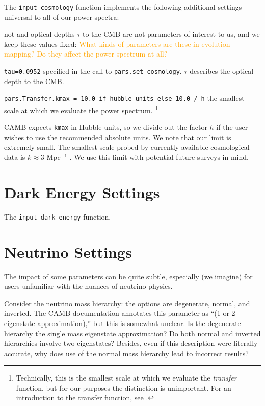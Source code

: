
The \verb|input_cosmology| function implements the following additional
settings universal to all of our power spectra:

 not and optical depths $\tau$ to the CMB 
are not parameters of interest to us, and we keep these values fixed:
\textcolor{orange}{What kinds of parameters are these in evolution mapping?
Do they affect the power spectrum at all?}

\verb|tau=0.0952| \quad specified in the call to \verb|pars.set_cosmology|.
$\tau$ describes the optical depth to the CMB.


\verb|pars.Transfer.kmax = 10.0 if hubble_units else 10.0 / h| \quad the smallest scale at which we evaluate the power spectrum.
\footnote{Technically, this is the smallest scale at which we evaluate the
\textit{transfer} function, but for our purposes the distinction is
unimportant. For an introduction to the transfer function, see \citet{FECS}.} 

CAMB expects \verb|kmax| in Hubble units, so we divide out the factor $h$ if 
the user wishes to use the recommended absolute units.
We note that our limit is extremely small. The smallest scale probed by
currently available cosmological data is $k \approx 3$ Mpc$^{-1}$
. We use this limit with potential future surveys in mind.


\section{Dark Energy Settings}

The \verb|input_dark_energy| function.

\section{Neutrino Settings}


The impact of some parameters can be quite subtle, especially (we imagine)
for users unfamiliar with the nuances of neutrino physics.

Consider the neutrino mass 
hierarchy: the options are degenerate, normal, and inverted. The CAMB 
documentation annotates this parameter as ``(1 or 2 eigenstate 
approximation),'' but this is somewhat unclear. Is the degenerate hierarchy 
the single mass eigenstate approximation? Do both normal and inverted 
hierarchies involve two eigenstates? Besides, even if this description were
literally accurate, why does use of the normal mass hierarchy lead to
incorrect results?

